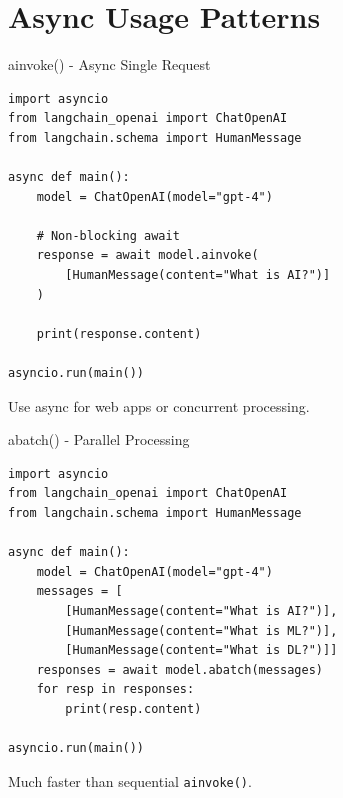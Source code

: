\documentclass[aspectratio=169,11pt]{beamer}
\begin{document}
\section{Async Usage Patterns}

\begin{frame}[fragile,shrink=5]{ainvoke() - Async Single Request}
  \begin{codebox}
    \begin{lstlisting}
import asyncio
from langchain_openai import ChatOpenAI
from langchain.schema import HumanMessage

async def main():
    model = ChatOpenAI(model="gpt-4")

    # Non-blocking await
    response = await model.ainvoke(
        [HumanMessage(content="What is AI?")]
    )

    print(response.content)

asyncio.run(main())
    \end{lstlisting}
  \end{codebox}
  \vspace{-0.1cm}
  \begin{tipbox}
    Use async for web apps or concurrent processing.
  \end{tipbox}
\end{frame}

\begin{frame}[fragile]{abatch() - Parallel Processing}
  \begin{codebox}
    \begin{lstlisting}[basicstyle=\ttfamily\tiny]
import asyncio
from langchain_openai import ChatOpenAI
from langchain.schema import HumanMessage

async def main():
    model = ChatOpenAI(model="gpt-4")
    messages = [
        [HumanMessage(content="What is AI?")],
        [HumanMessage(content="What is ML?")],
        [HumanMessage(content="What is DL?")]]
    responses = await model.abatch(messages)
    for resp in responses:
        print(resp.content)

asyncio.run(main())
    \end{lstlisting}
  \end{codebox}

  \begin{tipbox}[Parallelism]
    Much faster than sequential \texttt{ainvoke()}.
  \end{tipbox}
\end{frame}
\end{document}
